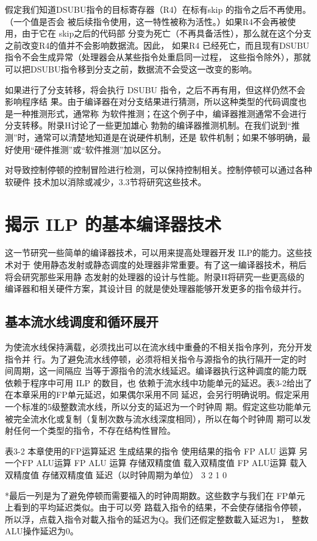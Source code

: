 假定我们知道DSUBU指令的目标寄存器（R4）在标有skip 的指令之后不再使用。（一个值是否会
被后续指令使用，这一特性被称为活性。）如果R4不会再被使用，由于它在 skip之后的代码部
分变为死亡（不再具备活性），那么就在这个分支之前改变R4的值并不会影响数据流。因此，
如果R4 已经死亡，而且现有DSUBU指令不会生成异常（处理器会从某些指令处重启同一过程，
这些指令除外），那就可以把DSUBU指令移到分支之前，数据流不会受这一改变的影响。

如果进行了分支转移，将会执行 DSUBU 指令，之后不再有用，但这样仍然不会影响程序结
果。由于编译器在对分支结果进行猜测，所以这种类型的代码调度也是一种推测形式，通常称
为软件推测；在这个例子中，编译器推测通常不会进行分支转移。附录H讨论了一些更加雄心
勃勃的编译器推测机制。在我们说到“推测”时，通常可以清楚地知道是在说硬件机制，还是
软件机制；如果不够明确，最好使用“硬件推测”或“软件推测”加以区分。

对导致控制停顿的控制冒险进行检测，可以保持控制相关。控制停顿可以通过各种软硬件
技术加以消除或减少，3.3节将研究这些技术。

\section{揭示 ILP 的基本编译器技术}
这一节研究一些简单的编译器技术，可以用来提高处理器开发 ILP的能力。这些技术对于
使用静态发射或静态调度的处理器非常重要。有了这一编译器技术，稍后将会研究那些采用静
态发射的处理器的设计与性能。附录H将研究一些更高级的编译器和相关硬件方案，其设计目
的就是使处理器能够开发更多的指令级并行。

\subsection{基本流水线调度和循环展开}
为使流水线保持满载，必须找出可以在流水线中重叠的不相关指令序列，充分开发指令并
行。为了避免流水线停顿，必须将相关指令与源指令的执行隔开一定的时间周期，这一间隔应
当等于源指令的流水线延迟。编译器执行这种调度的能力既依赖于程序中可用 ILP 的数目，也
依赖于流水线中功能单元的延迟。表3-2给出了在本章采用的FP单元延迟，如果偶尔采用不同
延迟，会另行明确说明。假定采用一个标准的5级整数流水线，所以分支的延迟为一个时钟周
期。假定这些功能单元被完全流水化或复制（复制次数与流水线深度相同），所以在每个时钟周
期可以发射任何一个类型的指令，不存在结构性冒险。

表3-2 本章使用的FP运算延迟
生成结果的指令
使用结果的指令
FP ALU 运算
另一个FP ALU运算
FP ALU 运算
存储双精度值
载入双精度值
FP ALU运算
载入双精度值
存储双精度值
延迟（以时钟周期为单位）
3
2
1
0

*最后一列是为了避免停顿而需要福入的时钟周期数。这些数字与我们在 FP单元上看到的平均延迟类似。由于可以旁
路载入指令的结果，不会使存储指令停顿，所以浮，点载入指令对載入指令的延迟为Q。我们还假定整数載入延迟为1，
整数ALU操作延迟为0。

